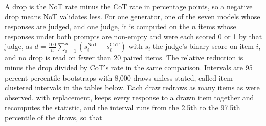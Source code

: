 A drop is the NoT rate minus the CoT rate in percentage points, so a negative
drop means NoT validates less. For one generator, one of the seven models
whose responses are judged, and one judge, it is computed on the $n$ items
whose responses under both prompts are non-empty
and were each scored 0 or 1 by that judge, as
$d = \tfrac{100}{n}\sum_{i=1}^{n}(s_i^{\mathrm{NoT}} - s_i^{\mathrm{CoT}})$
with $s_i$ the judge's binary score on item $i$, and no drop is read on fewer
than 20 paired items. The relative reduction is minus the drop divided by
CoT's rate in the same comparison.
Intervals are 95 percent percentile bootstraps with 8,000 draws unless
stated, called item-clustered intervals in the tables below. Each draw
redraws as many items as were observed, with replacement, keeps every
response to a drawn item together and recomputes the statistic, and the
interval runs from the 2.5th to the 97.5th percentile of the draws, so that
